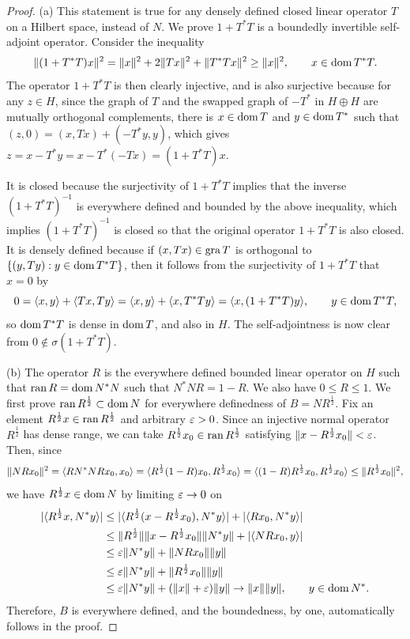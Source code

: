 \documentclass{../../large}
\begin{document}
\begin{proof}
(a)
This statement is true for any densely defined closed linear operator $T$ on a Hilbert space, instead of $N$.
We prove $1+T^*T$ is a boundedly invertible self-adjoint operator.
Consider the inequality
\[\|(1+T^*T)x\|^2=\|x\|^2+2\|Tx\|^2+\|T^*Tx\|^2\ge\|x\|^2,\qquad x\in\operatorname{dom} T^*T.\]
The operator $1+T^*T$ is then clearly injective, and is also surjective because for any $z\in H$, since the graph of $T$ and the swapped graph of $-T^*$ in $H\oplus H$ are mutually orthogonal complements, there is $x\in\operatorname{dom} T$ and $y\in\operatorname{dom} T^*$ such that $(z,0)=(x,Tx)+(-T^*y,y)$, which gives $z=x-T^*y=x-T^*(-Tx)=(1+T^*T)x$.

It is closed because the surjectivity of $1+T^*T$ implies that the inverse $(1+T^*T)^{-1}$ is everywhere defined and bounded by the above inequality, which implies $(1+T^*T)^{-1}$ is closed so that the original operator $1+T^*T$ is also closed.
It is densely defined because if $(x,Tx)\in\operatorname{gra} T$ is orthogonal to $\{(y,Ty):y\in\operatorname{dom} T^*T\}$, then it follows from the surjectivity of $1+T^*T$ that $x=0$ by
\[0=\langle x,y\rangle+\langle Tx,Ty\rangle=\langle x,y\rangle+\langle x,T^*Ty\rangle=\langle x,(1+T^*T)y\rangle,\qquad y\in\operatorname{dom} T^*T,\]
so $\operatorname{dom} T^*T$ is dense in $\operatorname{dom} T$, and also in $H$.
The self-adjointness is now clear from $0\notin\sigma(1+T^*T)$.

(b)
The operator $R$ is the everywhere defined bounded linear operator on $H$ such that $\operatorname{ran} R=\operatorname{dom} N^*N$ such that $N^*NR=1-R$.
We also have $0\le R\le1$.
We first prove $\operatorname{ran} R^{\frac12}\subset\operatorname{dom} N$ for everywhere definedness of $B=NR^{\frac12}$.
Fix an element $R^{\frac12}x\in\operatorname{ran} R^{\frac12}$ and arbitrary $\varepsilon>0$.
Since an injective normal operator $R^{\frac12}$ has dense range, we can take $R^{\frac12}x_0\in\operatorname{ran} R^{\frac12}$ satisfying $\|x-R^{\frac12}x_0\|<\varepsilon$.
Then, since
\[\|NRx_0\|^2
=\langle RN^*NRx_0,x_0\rangle
=\langle R^{\frac12}(1-R)x_0,R^{\frac12}x_0\rangle
=\langle(1-R)R^{\frac12}x_0,R^{\frac12}x_0\rangle
\le\|R^{\frac12}x_0\|^2,\]
we have $R^{\frac12}x\in\operatorname{dom} N$ by limiting $\varepsilon\to0$ on
\begin{align*}
|\langle R^{\frac12}x,N^*y\rangle|
&\le|\langle R^{\frac12}(x-R^{\frac12}x_0),N^*y\rangle|+|\langle Rx_0,N^*y\rangle|\\
&\le\|R^{\frac12}\|\|x-R^{\frac12}x_0\|\|N^*y\|+|\langle NRx_0,y\rangle|\\
&\le\varepsilon\|N^*y\|+\|NRx_0\|\|y\|\\
&\le\varepsilon\|N^*y\|+\|R^{\frac12}x_0\|\|y\|\\
&\le\varepsilon\|N^*y\|+(\|x\|+\varepsilon)\|y\|\to\|x\|\|y\|,\qquad y\in\operatorname{dom} N^*.
\end{align*}
Therefore, $B$ is everywhere defined, and the boundedness, by one, automatically follows in the proof.


\end{proof}
\end{document}

